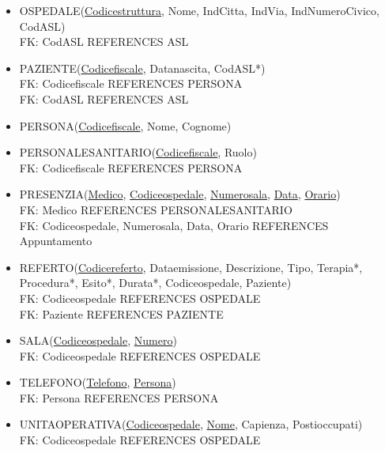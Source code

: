 \documentclass[a4paper,12pt]{report}
\begin{document}
\begin{itemize}
  \item OSPEDALE(\underline{Codice\textunderscore struttura}, Nome, Ind\textunderscore Citta, Ind\textunderscore Via, Ind\textunderscore Numero\textunderscore Civico, Cod\textunderscore ASL)
  \\ FK: Cod\textunderscore ASL REFERENCES ASL
  \item PAZIENTE(\underline{Codice\textunderscore fiscale}, Data\textunderscore nascita, Cod\textunderscore ASL*)
  \\ FK: Codice\textunderscore fiscale REFERENCES PERSONA
  \\ FK: Cod\textunderscore ASL REFERENCES ASL
  \item PERSONA(\underline{Codice\textunderscore fiscale}, Nome, Cognome)
  \item PERSONALE\textunderscore SANITARIO(\underline{Codice\textunderscore fiscale}, Ruolo)
  \\ FK: Codice\textunderscore fiscale REFERENCES PERSONA
  \item PRESENZIA(\underline{Medico}, \underline{Codice\textunderscore ospedale}, \underline{Numero\textunderscore sala}, \underline{Data}, \underline{Orario})
  \\ FK: Medico REFERENCES PERSONALE\textunderscore SANITARIO
  \\ FK: Codice\textunderscore ospedale, Numero\textunderscore sala, Data, Orario REFERENCES Appuntamento
  \item REFERTO(\underline{Codice\textunderscore referto}, Data\textunderscore emissione, Descrizione, Tipo, Terapia*, Procedura*, Esito*, Durata*, Codice\textunderscore ospedale, Paziente)
  \\ FK: Codice\textunderscore ospedale REFERENCES OSPEDALE
  \\ FK: Paziente REFERENCES PAZIENTE
  \item SALA(\underline{Codice\textunderscore ospedale}, \underline{Numero})
  \\ FK: Codice\textunderscore ospedale REFERENCES OSPEDALE
  \item TELEFONO(\underline{Telefono}, \underline{Persona})
  \\ FK: Persona REFERENCES PERSONA
  \item UNITA\textunderscore OPERATIVA(\underline{Codice\textunderscore ospedale}, \underline{Nome}, Capienza, Posti\textunderscore occupati)
  \\ FK: Codice\textunderscore ospedale REFERENCES OSPEDALE
\end{itemize}
\end{document}

